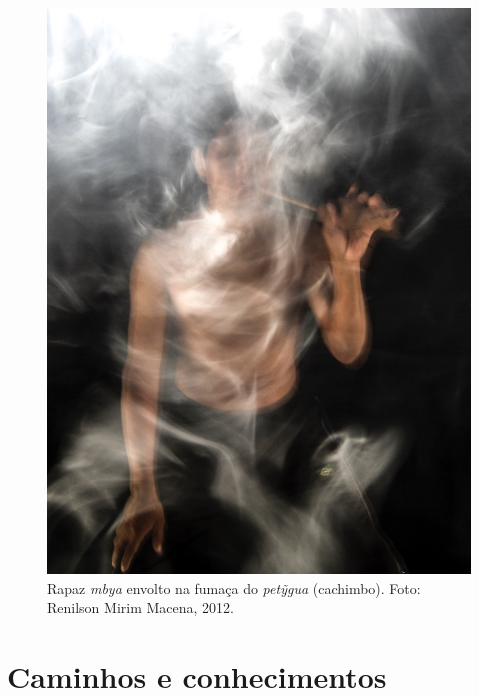 \begin{absolutelynopagebreak}
\begin{vplace}
 \begin{figure}[H]
 \begin{adjustwidth}{-2.7cm}{}
  \vspace{-3.05cm}
 \includegraphics[width=166mm]{./img/GUARANIS-img3.jpg}	
  \hfill
 \end{adjustwidth}
  \caption{Rapaz \emph{mbya} envolto na fumaça do \emph{petỹgua} (cachimbo). Foto: Renilson
Mirim Macena, 2012.}

\thispagestyle{empty}

\end{figure}
\end{vplace}

\end{absolutelynopagebreak}

\makeatletter\@openrightfalse
\movetooddpage
\part{Caminhos e conhecimentos}


